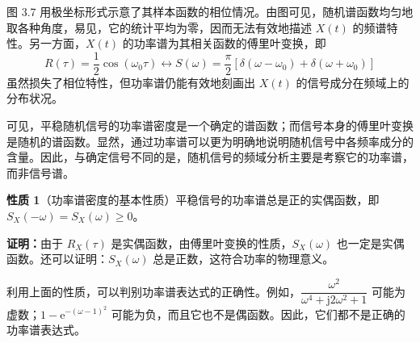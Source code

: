 \documentclass[11pt,openany,UTF8]{ctexbook}
\newcommand{\eu}{\mathrm{e}}                       %
\newcommand{\ju}{\mathrm{j}}                       %
\newcommand{\thm}[1]{\par\medskip\noindent\textbf{#1}\quad}
\begin{document}
图 3.7 用极坐标形式示意了其样本函数的相位情况\nobreak。由图可见\nobreak，随机谱函数均匀地取各种角度\nobreak，易见\nobreak，它的统计平均为零\nobreak，因而无法有效地描述 $X(t)$ 的频谱特性\nobreak。另一方面\nobreak，$X(t)$ 的功率谱为其相关函数的傅里叶变换\nobreak，即
\[
R(\tau)=\frac{1}{2}\cos(\omega_0\tau)\longleftrightarrow S(\omega)=\frac{\pi}{2}\left[\delta(\omega-\omega_0)+\delta(\omega+\omega_0)\right]
\]
虽然损失了相位特性\nobreak，但功率谱仍能有效地刻画出 $X(t)$ 的信号成分在频域上的分布状况\nobreak。

可见\nobreak，平稳随机信号的功率谱密度是一个确定的谱函数\nobreak；而信号本身的傅里叶变换是随机的谱函数\nobreak。显然\nobreak，通过功率谱可以更为明确地说明随机信号中各频率成分的含量\nobreak。因此\nobreak，与确定信号不同的是\nobreak，随机信号的频域分析主要是考察它的功率谱\nobreak，而非信号谱\nobreak。

\thm{性质 1}（功率谱密度的基本性质\nobreak）平稳信号的功率谱总是正的实偶函数\nobreak，即 $S_X(-\omega)=S_X(\omega)\geqslant 0$\nobreak。

\textbf{证明\nobreak：}由于 $R_X(\tau)$ 是实偶函数\nobreak，由傅里叶变换的性质\nobreak，$S_X(\omega)$ 也一定是实偶函数\nobreak。还可以证明\nobreak：$S_X(\omega)$ 总是正数\nobreak，这符合功率的物理意义\nobreak。

利用上面的性质\nobreak，可以判别功率谱表达式的正确性\nobreak。例如\nobreak，$\dfrac{\omega^2}{\omega^4+\ju2\omega^2+1}$ 可能为虚数\nobreak；$1-\eu^{-(\omega-1)^2}$ 可能为负\nobreak，而且它也不是偶函数\nobreak。因此\nobreak，它们都不是正确的功率谱表达式\nobreak。
\end{document}

